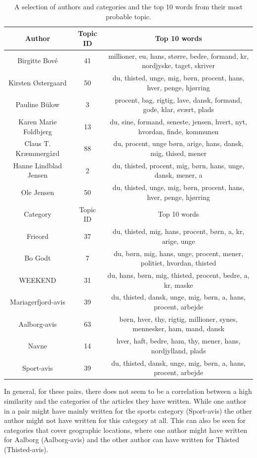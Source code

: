 \begin{table}[t]
	\centering
	\caption{A selection of authors and categories and the top 10 words from their most probable topic.}
	\begin{tabular}{c|c|c}
		\toprule
		Author & Topic ID & Top 10 words\\
		\midrule
		Birgitte Bové & 41 & millioner, eu, hans, større, bedre, formand, kr, nordjyske, taget, skriver \\
		Kirsten Østergaard & 50 & du, thisted, unge, mig, børn, procent, hans, hver, penge, hjørring \\
		Pauline Bülow & 3 & procent, bag, rigtig, lave, dansk, formand, gode, klar, svært, plads \\
		Karen Marie Foldbjerg & 13 & du, sine, formand, seneste, jensen, hvert, nyt, hvordan, finde, kommunen \\
		Claus T. Kræmmergård & 88 & du, procent, unge børn, arige, hans, dansk, mig, thised, mener \\
		Hanne Lindblad Jensen & 2 & du, thisted, procent, mig, børn, hans, unge, dansk, mener, a \\
		Ole Jensen & 50 & du, thisted, unge, mig, børn, procent, hans, hver, penge, hjørring \\
		\midrule
		Category & Topic ID & Top 10 words \\
		\midrule
		Frieord & 37 & du, thisted, mig, hans, procent, børn, a, kr, arige, unge \\
		Bo Godt & 7 & du, børn, mig, hans, unge, procent, mener, politiet, hvordan, thisted \\
		WEEKEND & 31 & du, hans, børn, mig, thisted, procent, bedre, a, kr, maske \\
		Mariagerfjord-avis & 39 & du, thisted, dansk, unge, mig, børn, a, hans, procent, arbejde \\
		Aalborg-avis & 63 & børn, hver, thy, rigtig, millioner, synes, mennesker, ham, mand, dansk \\
		Navne & 14 & hver, haft, bedre, ham, thy, mener, hans, nordjylland, plads \\
		Sport-avis & 39 & du, thisted, dansk, unge, mig, børn, a, hans, procent, arbejde \\
		\bottomrule
	\end{tabular}
	\label{tab:author_top_words}
\end{table}


In general, for these pairs, there does not seem to be a correlation between a high similarity and the categories of the articles they have written.
While one author in a pair might have mainly written for the sports category (Sport-avis) the other author might not have written for this category at all.
This can also be seen for categories that cover geographic locations, where one author might have written for Aalborg (Aalborg-avis) and the other author can have written for Thisted (Thisted-avis).

